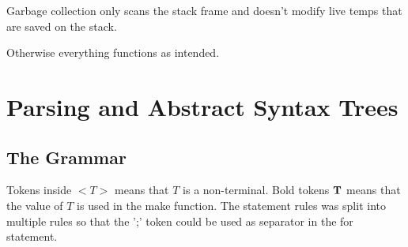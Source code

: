 \documentclass{article}
\begin{document}
Garbage collection only scans the stack frame and doesn't modify live temps that are saved on the stack.

Otherwise everything functions as intended.


\section{Parsing and Abstract Syntax Trees}

\subsection{The Grammar}
Tokens inside $< T >$ means that $T$ is a non-terminal. Bold tokens $\bf T$ means that the value of $T$ is used in the make function. The statement rules was split into multiple rules so that the ';' token could be used as separator in the for statement.
\end{document}
